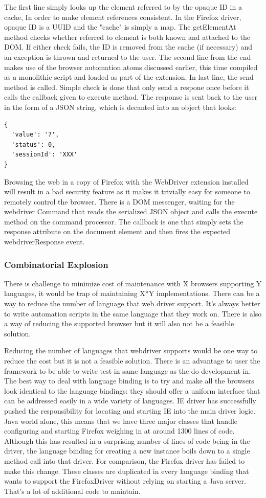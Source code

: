 \documentclass[article,type=msc,colorback,accentcolor=tud9c,twoside,11pt]{tudthesis}
\begin{document}
The first line simply looks up the element referred to by the opaque ID in a cache, In order to make element references consistent. In the Firefox driver, opaque ID is a UUID and the "cache" is simply a map. The getElementAt method checks whether referred to element is both known and attached to the DOM. If either check fails, the ID is removed from the cache (if necessary) and an exception is thrown and returned to the user.
The second line from the end makes use of the browser automation atoms discussed earlier, this time compiled as a monolithic script and loaded as part of the extension.
In last line, the send method is called. Simple check is done that only send a respone once before it calls the callback given to execute method. The response is sent back to the user in the form of a JSON string, which is decanted into an object that looks:
\begin{lstlisting}
{
  'value': '7',
  'status': 0,
  'sessionId': 'XXX'
}
\end{lstlisting}
Browsing the web in a copy of Firefox with the WebDriver extension installed will result in a bad security feature as it makes it trivially easy for someone to remotely control the browser.
There is a DOM messenger, waiting for the webdriver Command that reads the serialized JSON object and calls the execute method on the command processor. The callback is one that simply sets the response attribute on the document element and then fires the expected webdriverResponse event.

\subsubsection{Combinatorial Explosion}
There is challenge to minimize cost of maintenance with X browsers supporting Y languages, it would be trap of maintaining X*Y implementations. There can be a way to reduce the number of language that web driver support. It's always better to write automation scripts in the same language that they work on. There is also a way of reducing the supported browser but it will also not be a feasible solution.

Reducing the number of languages that webdriver supports would be one way to reduce the cost but it is not a feasible solution. There is an advantage to user the framework to be able to write test in same language as the do development in. The best way to deal with language binding is to try and make all the browsers look identical to the language bindings: they should offer a uniform interface that can be addressed easily in a wide variety of languages. IE driver has successfully pushed the responsibility for locating and starting IE into the main driver logic.  Java world alone, this means that we have three major classes that handle configuring and starting Firefox weighing in at around 1300 lines of code. Although this has resulted in a surprising number of lines of code being in the driver, the language binding for creating a new instance boils down to a single method call into that driver. For comparison, the Firefox driver has failed to make this change. These classes are duplicated in every language binding that wants to support the FirefoxDriver without relying on starting a Java server. That's a lot of additional code to maintain.
\end{document}
